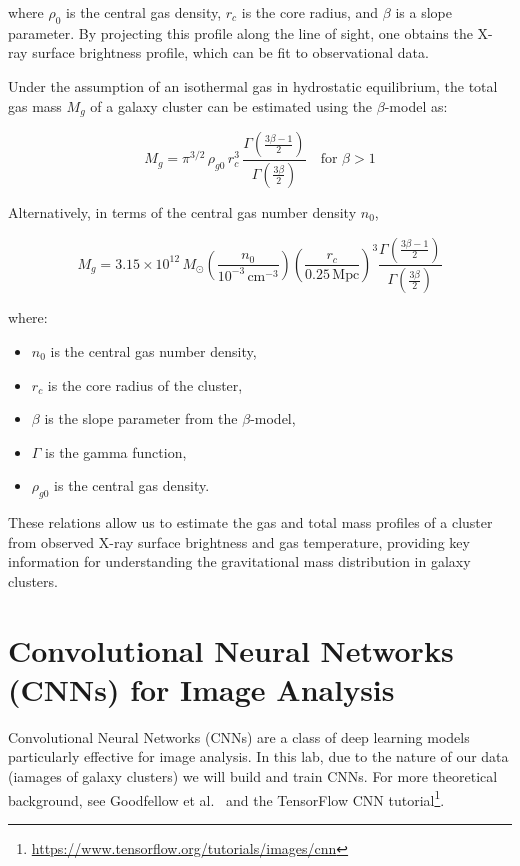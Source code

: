where $\rho_0$ is the central gas density, $r_c$ is the core radius, and $\beta$ is a slope parameter. By projecting this profile along the line of sight, one obtains the X-ray surface brightness profile, which can be fit to observational data.

Under the assumption of an isothermal gas in hydrostatic equilibrium, the total gas mass $M_g$ of a galaxy cluster can be estimated using the $\beta$-model as:

\[
M_g = \pi^{3/2} \, \rho_{g0} \, r_c^3 \, \frac{\Gamma\left( \frac{3\beta - 1}{2} \right)}{\Gamma\left( \frac{3\beta}{2} \right)} \quad \text{for } \beta > 1
\]

Alternatively, in terms of the central gas number density $n_0$,

\[
M_g = 3.15 \times 10^{12} \, M_\odot \left( \frac{n_0}{10^{-3} \, \text{cm}^{-3}} \right) \left( \frac{r_c}{0.25 \, \text{Mpc}} \right)^3 \frac{\Gamma\left( \frac{3\beta - 1}{2} \right)}{\Gamma\left( \frac{3\beta}{2} \right)}
\]

where:
\begin{itemize}
    \item $n_0$ is the central gas number density,
    \item $r_c$ is the core radius of the cluster,
    \item $\beta$ is the slope parameter from the $\beta$-model,
    \item $\Gamma$ is the gamma function,
    \item $\rho_{g0}$ is the central gas density.
\end{itemize}

These relations allow us to estimate the 
gas and total mass profiles of a cluster from observed X-ray 
surface brightness and gas temperature, providing key information 
for understanding the gravitational mass distribution in galaxy 
clusters.


\section{Convolutional Neural Networks (CNNs) for Image Analysis}

Convolutional Neural Networks (CNNs) are a class of deep learning 
models particularly effective for image analysis. In this lab, due to the nature of our data (iamages of galaxy clusters)
we will build and train CNNs.
For more theoretical background, 
see Goodfellow et al.~\cite{Goodfellow-et-al-2016} and the TensorFlow 
CNN tutorial\footnote{\url{https://www.tensorflow.org/tutorials/images/cnn}}. 


